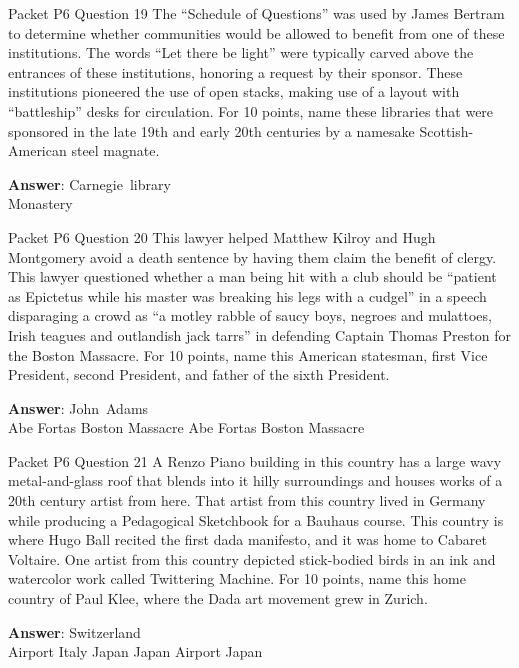 \begin{frame}{Packet P6 Question 19}
The “Schedule of Questions” was used by James Bertram to determine whether communities would be allowed   to benefit from one of these institutions. The words “Let there be light” were typically carved above the entrances of these institutions, honoring a request by their sponsor. These institutions pioneered   the use of open stacks, making use of a layout with “battleship” desks for   circulation. For 10 points, name these libraries that were sponsored in the late 19th and early 20th centuries by a namesake Scottish-American steel magnate.  

\textbf{Answer}: Carnegie\ library\\
 Monastery
\end{frame}

\begin{frame}{Packet P6 Question 20}
This lawyer helped Matthew Kilroy and Hugh Montgomery avoid a death sentence by having them claim the benefit of clergy. This lawyer questioned whether a man being hit with a club should be “patient as   Epictetus while his master was breaking his legs with a cudgel” in a speech disparaging a crowd as “a motley rabble of saucy boys, negroes and mulattoes, Irish teagues and outlandish jack tarrs” in defending Captain Thomas Preston for the Boston     Massacre.  For 10 points, name this American statesman, first Vice President, second President, and father of the   sixth President.    

\textbf{Answer}: John\ Adams\\
 Abe Fortas
 Boston Massacre
 Abe Fortas
 Boston Massacre
\end{frame}

\begin{frame}{Packet P6 Question 21}
A Renzo Piano building   in this country has     a large wavy metal-and-glass roof that blends into it hilly surroundings and houses works of a 20th century artist from here. That artist from this country lived in Germany while producing a Pedagogical Sketchbook for a Bauhaus course. This country is where Hugo Ball recited the first dada manifesto, and it was home to Cabaret Voltaire. One artist from this country depicted stick-bodied birds in an ink and watercolor work called Twittering Machine. For 10   points, name this home country of Paul Klee, where the Dada art movement grew in Zurich.      

\textbf{Answer}: Switzerland\\
 Airport
 Italy
 Japan
 Japan
 Airport
 Japan
\end{frame}

